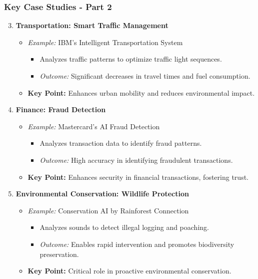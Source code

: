 \documentclass{beamer}
\begin{document}
\begin{frame}[fragile]
    \frametitle{Key Case Studies - Part 2}
    \begin{enumerate}
        \setcounter{enumi}{2}
        \item \textbf{Transportation: Smart Traffic Management}
        \begin{itemize}
            \item \textit{Example:} IBM's Intelligent Transportation System
            \begin{itemize}
                \item Analyzes traffic patterns to optimize traffic light sequences.
                \item \textit{Outcome:} Significant decreases in travel times and fuel consumption.
            \end{itemize}
            \item \textbf{Key Point:} Enhances urban mobility and reduces environmental impact.
        \end{itemize}

        \item \textbf{Finance: Fraud Detection}
        \begin{itemize}
            \item \textit{Example:} Mastercard's AI Fraud Detection
            \begin{itemize}
                \item Analyzes transaction data to identify fraud patterns.
                \item \textit{Outcome:} High accuracy in identifying fraudulent transactions.
            \end{itemize}
            \item \textbf{Key Point:} Enhances security in financial transactions, fostering trust.
        \end{itemize}

        \item \textbf{Environmental Conservation: Wildlife Protection}
        \begin{itemize}
            \item \textit{Example:} Conservation AI by Rainforest Connection
            \begin{itemize}
                \item Analyzes sounds to detect illegal logging and poaching.
                \item \textit{Outcome:} Enables rapid intervention and promotes biodiversity preservation.
            \end{itemize}
            \item \textbf{Key Point:} Critical role in proactive environmental conservation.
        \end{itemize}
    \end{enumerate}
\end{frame}
\end{document}

